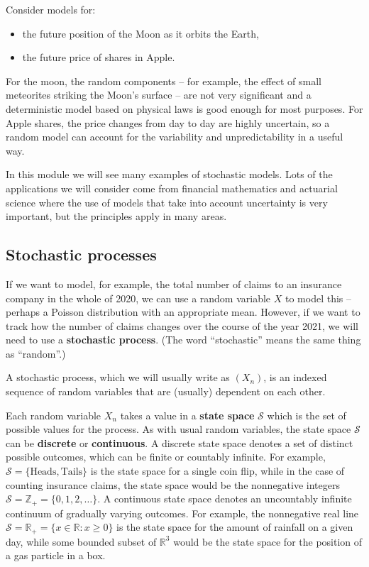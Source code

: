 \documentclass[
  a4paper,
]{article}
\providecommand{\tightlist}{%
  \setlength{\itemsep}{0pt}\setlength{\parskip}{0pt}}
\theoremstyle{definition}
\theoremstyle{definition}
\theoremstyle{definition}
\theoremstyle{remark}
\begin{document}
Consider models for:

\begin{itemize}
\tightlist
\item
  the future position of the Moon as it orbits the Earth,
\item
  the future price of shares in Apple.
\end{itemize}

For the moon, the random components -- for example, the effect of small meteorites striking the Moon's surface -- are not very significant and a deterministic model based on physical laws is good enough for most purposes. For Apple shares, the price changes from day to day are highly uncertain, so a random model can account for the variability and unpredictability in a useful way.

In this module we will see many examples of stochastic models. Lots of the applications we will consider come from financial mathematics and actuarial science where the use of models that take into account uncertainty is very important, but the principles apply in many areas.

\hypertarget{stochastic-processes}{%
\subsection{Stochastic processes}\label{stochastic-processes}}

If we want to model, for example, the total number of claims to an insurance company in the whole of 2020, we can use a random variable \(X\) to model this -- perhaps a Poisson distribution with an appropriate mean. However, if we want to track how the number of claims changes over the course of the year 2021, we will need to use a \textbf{stochastic process}. (The word ``stochastic'' means the same thing as ``random''.)

A stochastic process, which we will usually write as \((X_n)\), is an indexed sequence of random variables that are (usually) dependent on each other.

Each random variable \(X_n\) takes a value in a \textbf{state space} \(\mathcal S\) which is the set of possible values for the process. As with usual random variables, the state space \(\mathcal S\) can be \textbf{discrete} or \textbf{continuous}. A discrete state space denotes a set of distinct possible outcomes, which can be finite or countably infinite. For example, \(\mathcal S = \{\text{Heads},\text{Tails}\}\) is the state space for a single coin flip, while in the case of counting insurance claims, the state space would be the nonnegative integers \(\mathcal S = \mathbb Z_+ = \{0,1,2,\dots\}\). A continuous state space denotes an uncountably infinite continuum of gradually varying outcomes. For example, the nonnegative real line \(\mathcal S = \mathbb R_+ = \{x \in \mathbb R : x \geq 0\}\) is the state space for the amount of rainfall on a given day, while some bounded subset of \(\mathbb R^3\) would be the state space for the position of a gas particle in a box.
\end{document}
